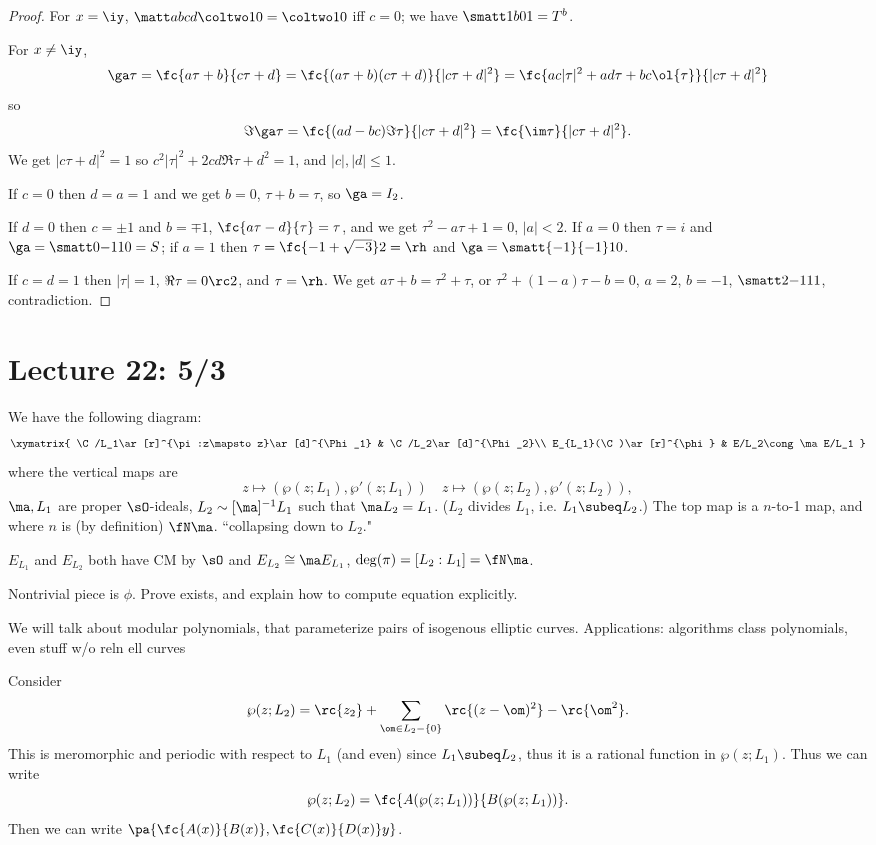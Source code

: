 \begin{proof}
For $x=\iy$, $\matt abcd\coltwo 10=\coltwo 10$ iff $c=0$; we have $\smatt 1b01=T^b$.

For $x\ne \iy$, 
\[
\ga\tau=\fc{a\tau+b}{c\tau+d}=\fc{(a\tau+b)(c\tau+d)}{|c\tau+d|^2}=\fc{ac|\tau|^2+ad\tau+bc\ol{\tau}}{|c\tau +d|^2}
\]
so
\[
\Im \ga\tau=\fc{(ad-bc)\Im \tau}{|c\tau+d|^2}
=\fc{\im\tau}{|c\tau+d|^2}.
\]
We get $|c\tau+d|^2=1$ so $c^2|\tau|^2+2cd\Re \tau+d^2=1$, and $|c|,|d|\le 1$.

If $c=0$ then $d=a=1$ and we get $b=0$, $\tau+b=\tau$, so $\ga=I_2$.

If $d=0$ then $c=\pm 1$ and $b=\mp1$, $\fc{a\tau-d}{\tau}=\tau$, and we get $\tau^2-a\tau +1=0$, $|a|<2$.
If $a=0$ then $\tau=i$ and $\ga=\smatt0{-1}10=S$; if $a=1$ then $\tau=\fc{-1+\sqrt{-3}}2=\rh$ and $\ga=\smatt{-1}{-1}10$.

If $c=d=1$ then $|\tau|=1$, $\Re\tau=0\rc 2$, and $\tau=\rh$. We get $a\tau+b=\tau^2+\tau$, or $\tau^2+(1-a)\tau-b=0$, $a=2$, $b=-1$, $\smatt 2{-1}11$, contradiction.
\end{proof}
\section{Lecture 22: 5/3}
We have the following diagram:
\begin{equation}\label{eq:lattice-ec-maps}
\xymatrix{
\C/L_1\ar[r]^{\pi:z\mapsto z}\ar[d]^{\Phi_1} & \C/L_2\ar[d]^{\Phi_2}\\
E_{L_1}(\C)\ar[r]^{\phi} & E/L_2\cong \ma E/L_1
}
\end{equation}
where the vertical maps are 
\[
z\mapsto (\wp(z;L_1),\wp'(z;L_1))\quad z\mapsto (\wp(z;L_2),\wp'(z;L_2)),
\]
$\ma,L_1$ are proper $\sO$-ideals, $L_2\sim [\ma]^{-1}L_1$ such that $\ma L_2=L_1$. %
($L_2$ divides $L_1$, i.e. $L_1\subeq L_2$.) The top map is a $n$-to-1 map, and where $n$ is (by definition) $\fN\ma$.
``collapsing down to $L_2$."

$E_{L_1}$ and $E_{L_2}$ both have CM by $\sO$ and $E_{L_2}\cong \ma E_{L_1}$, $\deg(\pi)=[L_2:L_1]=\fN\ma$.

Nontrivial piece is $\phi$. Prove exists, and explain how to compute equation explicitly.

We will talk about modular polynomials, that parameterize pairs of isogenous elliptic curves. Applications: algorithms class polynomials, 
even stuff w/o reln ell curves

Consider
\[
\wp(z;L_2)=\rc{z_2}+\sum_{\om\in L_2-\{0\}} \rc{(z-\om)^2}-\rc{\om^2}.
\]
This is meromorphic and periodic with respect to $L_1$ (and even) since $L_1\subeq L_2$, thus it is a rational function in $\wp(z;L_1)$. Thus we can write
\[
\wp(z;L_2)=\fc{A(\wp(z;L_1))}{B(\wp(z;L_1))}.
\]
Then we can write $\pa{\fc{A(x)}{B(x)},\fc{C(x)}{D(x)}y}$.

